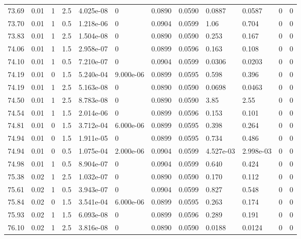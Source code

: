 \documentclass[preview]{standalone}
\begin{document}
{{{{{{{{{{{{{{{\begin{tabular}{L{1.2cm}C{1.2cm} C{0.3cm}C{0.5cm} C{1.4cm}C{1.4cm} C{1.4cm}C{1.4cm} C{1.6cm}C{1.6cm} C{1.6cm}C{1.6cm}}
  73.69  &  0.01  & 1     & 2.5 &  4.025e-08  & 0  &  0.0890&   0.0590& 0.0887 & 0.0587   &  0 & 0  \\ 
  73.70  &  0.01  & 1     & 0.5 &  1.218e-06  & 0  &  0.0904&   0.0599& 1.06 & 0.704   &  0 & 0  \\ 
  73.83  &  0.01  & 1     & 2.5 &  1.504e-08  & 0  &  0.0890&   0.0590& 0.253 & 0.167   &  0 & 0  \\ 
  74.06  &  0.01  & 1     & 1.5 &  2.958e-07  & 0  &  0.0899&   0.0596& 0.163 & 0.108   &  0 & 0  \\ 
  74.10  &  0.01  & 1     & 0.5 &  7.210e-07  & 0  &  0.0904&   0.0599& 0.0306 & 0.0203   &  0 & 0  \\ 
  74.19  &  0.01  & 0     & 1.5 &  5.240e-04  & 9.000e-06  &  0.0899&   0.0595& 0.598 & 0.396   &  0 & 0  \\ 
  74.19  &  0.01  & 1     & 2.5 &  5.163e-08  & 0  &  0.0890&   0.0590& 0.0698 & 0.0463   &  0 & 0  \\ 
  74.50  &  0.01  & 1     & 2.5 &  8.783e-08  & 0  &  0.0890&   0.0590& 3.85 & 2.55   &  0 & 0  \\ 
  74.54  &  0.01  & 1     & 1.5 &  2.014e-06  & 0  &  0.0899&   0.0596& 0.153 & 0.101   &  0 & 0  \\ 
  74.81  &  0.01  & 0     & 1.5 &  3.712e-04  & 6.000e-06  &  0.0899&   0.0595& 0.398 & 0.264   &  0 & 0  \\ 
  74.94  &  0.01  & 0     & 1.5 &  1.911e-05  & 0  &  0.0899&   0.0595& 0.734 & 0.486   &  0 & 0  \\ 
  74.94  &  0.01  & 0     & 0.5 &  1.075e-04  & 2.000e-06  &  0.0904&   0.0599& 4.527e-03 & 2.998e-03   &  0 & 0  \\ 
  74.98  &  0.01  & 1     & 0.5 &  8.904e-07  & 0  &  0.0904&   0.0599& 0.640 & 0.424   &  0 & 0  \\ 
  75.38  &  0.02  & 1     & 2.5 &  1.032e-07  & 0  &  0.0890&   0.0590& 0.170 & 0.112   &  0 & 0  \\ 
  75.61  &  0.02  & 1     & 0.5 &  3.943e-07  & 0  &  0.0904&   0.0599& 0.827 & 0.548   &  0 & 0  \\ 
  75.84  &  0.02  & 0     & 1.5 &  3.541e-04  & 6.000e-06  &  0.0899&   0.0595& 0.263 & 0.174   &  0 & 0  \\ 
  75.93  &  0.02  & 1     & 1.5 &  6.093e-08  & 0  &  0.0899&   0.0596& 0.289 & 0.191   &  0 & 0  \\ 
  76.10  &  0.02  & 1     & 2.5 &  3.816e-08  & 0  &  0.0890&   0.0590& 0.0188 & 0.0124   &  0 & 0  \\ 

\end{tabular}}}}}}}}}}}}}}}}
\end{document}
